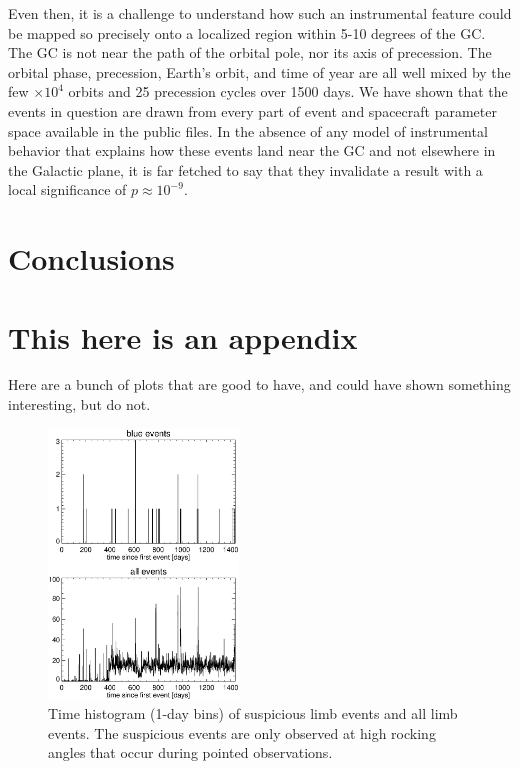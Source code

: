 \documentclass[aps,twocolumn,prd,superscriptaddress,showpacs,nofootinbib,fixfloat]{revtex4}
\begin{document}
Even then, it is a challenge to understand how such an instrumental feature
could be mapped so precisely onto a localized region within 5-10 degrees of
the GC.  The GC is not near the path of the orbital pole, nor its axis of
precession.  The orbital phase, precession, Earth's orbit, and time of year
are all well mixed by the few $\times10^4$ orbits and 25 precession cycles
over 1500 days.  We have shown that the events in question are drawn from
every part of event and spacecraft parameter space available in the public
files.  In the absence of any model of instrumental behavior that explains how
these events land near the GC and not elsewhere in the Galactic plane, it is
far fetched to say that they invalidate a result with a local significance of
$p\approx10^{-9}$.  


\section{Conclusions}

\clearpage
\appendix
\section{This here is an appendix}

Here are a bunch of plots that are good to have, and could have shown
something interesting, but do not. 

\begin{figure}[p]
\centering
\includegraphics[width=0.45\textwidth]{plots/timehist.ps}
\caption{Time histogram (1-day bins) of suspicious limb events and all limb
events.  The suspicious events are only observed at high rocking
angles that occur during pointed observations.
}
\label{fig:timehist}
\end{figure}
\end{document}
